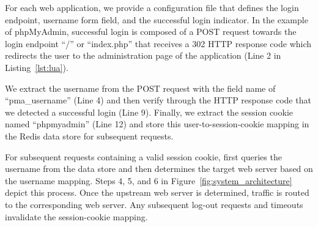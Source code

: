 For each web application, we provide a configuration file that defines the login endpoint, username form field, and the successful login indicator. 
In the example of phpMyAdmin, successful login is composed of a POST request towards the login endpoint ``/'' or ``index.php'' that receives a 302 HTTP response code which redirects the user to the administration page of the application (Line 2 in Listing~\ref{lst:lua}). 

We extract the username from the POST request with the field name of ``pma\_username'' (Line 4) 
and then verify through the HTTP response code that we detected a successful login (Line 9). Finally, we extract the session cookie named ``phpmyadmin'' (Line 12) and store this user-to-session-cookie mapping in the Redis data store for subsequent requests. 

For subsequent requests containing a valid session cookie, \dbltr{} first queries the username from the data store and then determines the target web server based on the username mapping. 
Steps 4, 5, and 6 in Figure~\ref{fig:system_architecture} depict this process. 
Once the upstream web server is determined, traffic is routed to the corresponding web server. 
Any subsequent log-out requests and timeouts invalidate the session-cookie mapping.